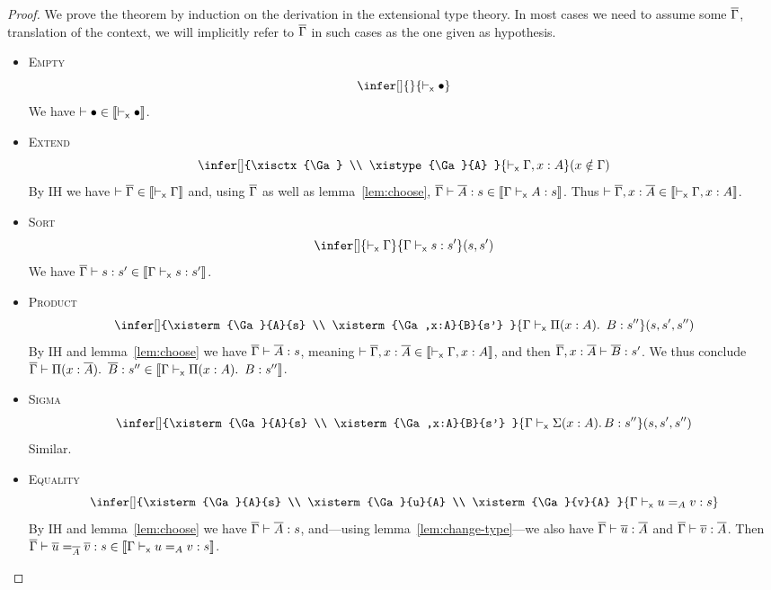 \begin{proof}
  We prove the theorem by induction on the derivation in the extensional
  type theory. In most cases we need to assume some $\Gb$, translation of the
  context, we will implicitly refer to $\Gb$ in such cases as the one given as
  hypothesis.
  \leavevmode
  \begin{itemize}
    \item \textsc{Empty}
    \[
      \infer[]
        { }
        {\xisctx{\ctxempty}}
    \]
    We have $\isctx{\ctxempty} \in \trans{\xisctx{\ctxempty}}$.

    \item \textsc{Extend}
    \[
      \infer[]
        {\xisctx{\Ga} \\
         \xistype{\Ga}{A}
        }
        {\xisctx{\Ga, x:A}}
      (x \notin \Ga)
    \]
    By IH we have $\isctx{\Gb} \in \trans{\xisctx{\Ga}}$ and, using $\Gb$
    as well as lemma~\ref{lem:choose},
    $\isterm{\Gb}{\Ab}{s} \in \trans{\xisterm{\Ga}{A}{s}}$.
    Thus $\isctx{\Gb, x:\Ab} \in \trans{\xisctx{\Ga, x:A}}$.

    \item \textsc{Sort}
    \[
      \infer[]
        {\xisctx{\Ga}}
        {\xisterm{\Ga}{s}{s'}}
      (s,s')
    \]
    We have $\isterm{\Gb}{s}{s'} \in \trans{\xisterm{\Ga}{s}{s'}}$.

    \item \textsc{Product}
    \[
      \infer[]
        {\xisterm{\Ga}{A}{s} \\
         \xisterm{\Ga,x:A}{B}{s'}
        }
        {\xisterm{\Ga}{\Prod{x:A} B}{s''}}
      (s,s',s'')
    \]
    By IH and lemma~\ref{lem:choose} we have $\isterm{\Gb}{\Ab}{s}$,
    meaning $\isctx{\Gb,x:\Ab} \in \trans{\xisctx{\Ga, x:A}}$,
    and then $\isterm{\Gb,x:\Ab}{\Bb}{s'}$.
    We thus conclude
    $\isterm{\Gb}{\Prod{x:\Ab} \Bb}{s''} \in
    \trans{\xisterm{\Ga}{\Prod{x:A} B}{s''}}$.

    \item \textsc{Sigma}
    \[
      \infer[]
        {\xisterm{\Ga}{A}{s} \\
         \xisterm{\Ga,x:A}{B}{s'}
        }
        {\xisterm{\Ga}{\Sum{x:A} B}{s''}}
      (s,s',s'')
    \]
    Similar.

    \item \textsc{Equality}
    \[
      \infer[]
        {\xisterm{\Ga}{A}{s} \\
         \xisterm{\Ga}{u}{A} \\
         \xisterm{\Ga}{v}{A}
        }
        {\xisterm{\Ga}{\Eq{A}{u}{v}}{s}}
    \]
    By IH and lemma~\ref{lem:choose} we have $\isterm{\Gb}{\Ab}{s}$,
    and---using lemma~\ref{lem:change-type}---we also have
    $\isterm{\Gb}{\ub}{\Ab}$ and $\isterm{\Gb}{\vb}{\Ab}$.
    Then
    $\isterm{\Gb}{\Eq{\Ab}{\ub}{\vb}}{s} \in
    \trans{\xisterm{\Ga}{\Eq{A}{u}{v}}{s}}$.


\end{itemize}
\end{proof}
